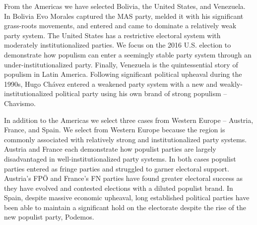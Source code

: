 \documentclass[a4paper,12pt]{article}\usepackage[]{graphicx}\usepackage[]{color}
\begin{document}
\par
From the Americas we have selected Bolivia, the United States, and Venezuela. In Bolivia Evo Morales captured the MAS party, melded it with his significant grass-roots movements, and entered and came to dominate a relatively weak party system. The United States has a restrictive electoral system with moderately institutionalized parties. We focus on the 2016 U.S. election to demonstrate how populism can enter a seemingly stable party system through an under-institutionalized party. Finally, Venezuela is the quintessential story of populism in Latin America. Following significant political upheaval during the 1990s, Hugo Ch\'{a}vez entered a weakened party system with a new and weakly-institutionalized political party using his own brand of strong populism – Chavismo.
\par
In addition to the Americas we select three cases from Western Europe -- Austria, France, and Spain. We select from Western Europe because the region is commonly associated with relatively strong and institutionalized party systems. Austria and France each demonstrate how populist parties are largely disadvantaged in well-institutionalized party systems. In both cases populist parties entered as fringe parties and struggled to garner electoral support. Austria's FP\"{O} and France's FN parties have found greater electoral success as they have evolved and contested elections with a diluted populist brand. In Spain, despite massive economic upheaval, long established political parties have been able to maintain a significant hold on the electorate despite the rise of the new populist party, Podemos. 
\end{document}
